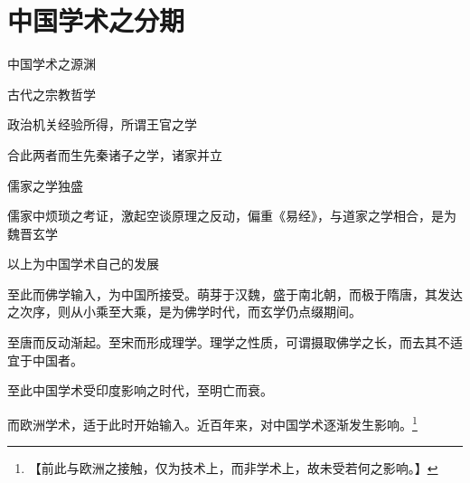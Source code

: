 \chapter{中国学术之分期}

中国学术之源渊

\hspace{2em}古代之宗教哲学

\hspace{2em}政治机关经验所得，所谓王官之学

合此两者而生先秦诸子之学，诸家并立

儒家之学独盛

儒家中烦琐之考证，激起空谈原理之反动，偏重《易经》，与道家之学相合，是为魏晋玄学

以上为中国学术自己的发展

至此而佛学输入，为中国所接受。萌芽于汉魏，盛于南北朝，而极于隋唐，其发达之次序，则从小乘至大乘，是为佛学时代，而玄学仍点缀期间。

至唐而反动渐起。至宋而形成理学。理学之性质，可谓摄取佛学之长，而去其不适宜于中国者。

至此中国学术受印度影响之时代，至明亡而衰。

而欧洲学术，适于此时开始输入。近百年来，对中国学术逐渐发生影响。\footnote{【前此与欧洲之接触，仅为技术上，而非学术上，故未受若何之影响。】}

